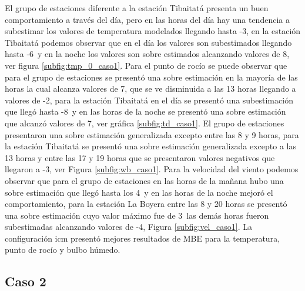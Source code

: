 El grupo de estaciones diferente a la estación Tibaitatá presenta un buen comportamiento a través del día, pero en las horas del día hay una tendencia a subestimar los valores de temperatura modelados llegando hasta -3\celc, en la estación Tibaitatá podemos observar que en el día los valores son subestimados llegando hasta -6\celc\ y en la noche los valores son sobre estimados alcanzando valores de 8\celc, ver figura \ref{subfig:tmp_0_caso1}. Para el punto de rocío se puede observar que para el grupo de estaciones se presentó una sobre estimación en la mayoría de las horas la cual alcanza valores de 7\celc, que se ve disminuida a las 13 horas llegando a valores de -2\celc, para la estación Tibaitatá en el día se presentó una subestimación que llegó hasta -8\celc\ y en las horas de la noche se presentó una sobre estimación que alcanzó valores de 7\celc, ver gráfica \ref{subfig:td_caso1}. El grupo de estaciones presentaron una sobre estimación generalizada excepto entre las 8 y 9 horas, para la estación Tibaitatá se presentó una sobre estimación generalizada excepto a las 13 horas y entre las 17 y 19 horas que se presentaron valores negativos que llegaron a -3\celc, ver Figura \ref{subfig:wb_caso1}. Para la velocidad del viento podemos observar que para el grupo de estaciones en las horas de la mañana hubo una sobre estimación que llegó hasta los 4\celc\ y en las horas de la noche mejoró el comportamiento, para la estación La Boyera entre las 8 y 20 horas se presentó una sobre estimación cuyo valor máximo fue de 3\celc\ las demás horas fueron subestimadas alcanzando valores de -4\celc, Figura \ref{subfig:vel_caso1}. La configuración icm presentó mejores resultados de MBE para la temperatura, punto de rocío y bulbo húmedo.\\



\subsection{Caso 2}

